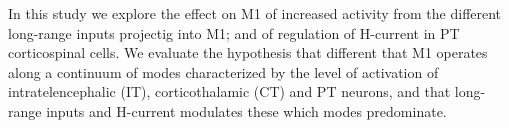 In this study we explore the effect on M1 of increased activity from the different long-range inputs projectig into M1; and of regulation of H-current in PT corticospinal cells. We evaluate the hypothesis that different that M1 operates along a continuum of modes characterized by the level of activation of intratelencephalic (IT), corticothalamic (CT) and PT neurons, and that long-range inputs and H-current modulates these which modes predominate. 

